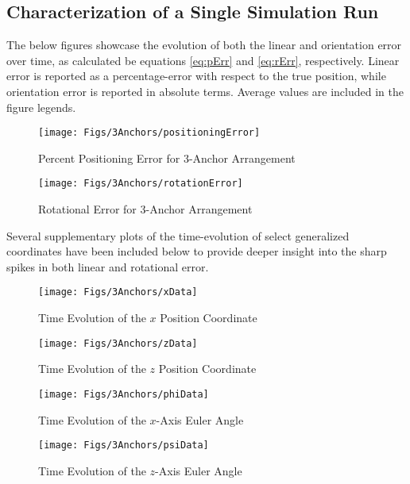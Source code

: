 \documentclass{report}
\begin{document}
			\subsection{Characterization of a Single Simulation Run} \label{3anchor}
				The below figures showcase the evolution of both the linear and orientation error over time, as calculated be equations \ref{eq:pErr} and \ref{eq:rErr}, respectively. Linear error is reported as a percentage-error with respect to the true position, while orientation error is reported in absolute terms. Average values are included in the figure legends.
				\begin{figure}[H]
					\centering
					\begin{minipage}{0.5\textwidth}
						\centering
						\label{fig:posErr3}
						\texttt{[image: Figs/3Anchors/positioningError]}
						\parbox{0.8\textwidth}{\caption{\centering Percent Positioning Error for 3-Anchor Arrangement}}
					\end{minipage}%
					\begin{minipage}{0.5\textwidth}
						\centering
						\label{fig:rotErr3}
						\texttt{[image: Figs/3Anchors/rotationError]}
						\parbox{0.8\textwidth}{\caption{\centering Rotational Error for 3-Anchor Arrangement}}
					\end{minipage}
				\end{figure}\noindent
				Several supplementary plots of the time-evolution of select generalized coordinates have been included below to provide deeper insight into the sharp spikes in both linear and rotational error.
				\begin{figure}[H]
					\centering
					\begin{minipage}{0.5\textwidth}
						\centering
						\texttt{[image: Figs/3Anchors/xData]}
						\parbox{0.8\textwidth}{\caption{\centering Time Evolution of the $x$ Position Coordinate}}
						\label{fig:x3}
					\end{minipage}%
					\begin{minipage}{0.5\textwidth}
						\centering
						\texttt{[image: Figs/3Anchors/zData]}
						\parbox{0.8\textwidth}{\caption{\centering Time Evolution of the $z$ Position Coordinate}}
						\label{fig:z3}
					\end{minipage}
				\end{figure}
				\begin{figure}[H]
					\centering
					\begin{minipage}{0.5\textwidth}
						\centering
						\texttt{[image: Figs/3Anchors/phiData]}
						\parbox{0.8\textwidth}{\caption{\centering Time Evolution of the $x$-Axis Euler Angle}}
						\label{fig:phi3}
					\end{minipage}%
					\begin{minipage}{0.5\textwidth}
						\centering
						\texttt{[image: Figs/3Anchors/psiData]}
						\parbox{0.8\textwidth}{\caption{\centering Time Evolution of the $z$-Axis Euler Angle}}
						\label{fig:psi3}
					\end{minipage}
				\end{figure}
\end{document}
